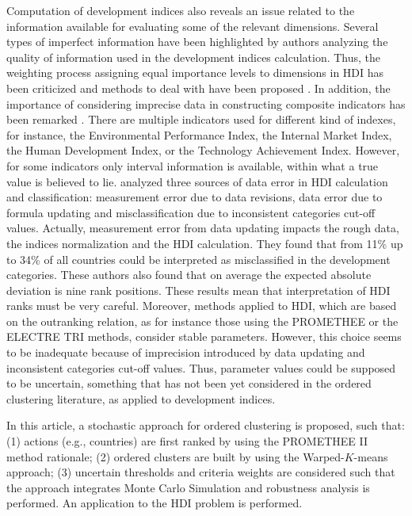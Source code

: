 \documentclass[]{elsarticle}
\theoremstyle{definition}
\begin{document}
Computation of development indices also  reveals an issue related to the information available for evaluating some of the relevant dimensions.  Several types of imperfect information have been highlighted by authors analyzing the quality of information used in the development indices calculation. Thus, the weighting process assigning equal importance levels to dimensions in HDI has been criticized and methods to deal with have been proposed \citep{Zheng2015}. In addition, the importance of considering imprecise data in constructing composite indicators has been remarked \citep{Cherchye2011}.  There are multiple indicators used for different kind of indexes, for instance, the Environmental Performance Index, the Internal Market Index, the Human Development Index, or the Technology Achievement Index. However, for some indicators only interval information is available, within what a true value is believed to lie.   \cite{Wolff2011} analyzed three sources of data error in HDI calculation and classification: measurement error due to data revisions, data error due to formula updating and misclassification due to inconsistent categories cut-off values. Actually,  measurement error from data updating impacts the rough data, the indices normalization and the HDI calculation. They found that from 11\% up to 34\% of all countries could be interpreted as misclassified in the development categories. These authors also found that on average the expected absolute deviation is nine rank positions. These results mean that interpretation of HDI ranks must be very careful.  Moreover, methods applied to HDI, which are based on the outranking relation, as for instance those using the PROMETHEE or the ELECTRE TRI methods, consider stable parameters.  However, this choice seems to be inadequate because of imprecision introduced by data updating and inconsistent categories cut-off values.  Thus, parameter values could be supposed to be uncertain, something that has not been yet considered in the ordered clustering literature, as applied to development indices.

In this article, a stochastic approach for ordered clustering is proposed, such that:  (1) actions (e.g., countries) are first ranked by using the PROMETHEE II method rationale; (2)  ordered clusters are built by using the Warped-$K$-means approach; (3) uncertain thresholds and criteria weights are considered such that the approach integrates  Monte Carlo Simulation and robustness analysis is performed. An application to the HDI problem is performed.
\end{document}
